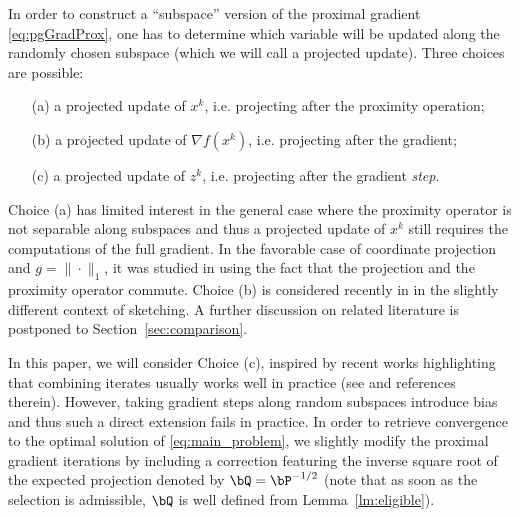 In order to construct a ``subspace'' version of the proximal gradient \eqref{eq:pgGradProx}, one has to determine which variable will be updated along the randomly chosen subspace (which we will call a projected update). Three choices are possible: 
\begin{itemize}
    \item[(a)] a projected update of $x^k$,  i.e. projecting after the proximity operation;
    \item[(b)] a projected update of $\nabla f(x^k)$,  i.e. projecting after the gradient;
    \item[(c)] a projected update of $z^k$,  i.e. projecting after the gradient \emph{step}.
\end{itemize}
Choice (a) has limited interest in the general case where the proximity operator is not separable along subspaces and thus a projected update of $x^k$ still requires the computations of the full gradient. In the favorable case of coordinate projection and $g=\|\cdot\|_1$, it was studied in \cite{qu2016coordinate} using the fact that the projection and the proximity operator commute. Choice (b) is considered recently in \cite{hanzely2018sega} in the slightly different context of sketching. A further discussion on related literature is postponed to Section~\ref{sec:comparison}.

In this paper, we will consider %
Choice (c), inspired by recent works highlighting that combining iterates usually works well in practice (see \cite{mishchenko2018distributed} and references therein). However, taking gradient steps along random subspaces introduce bias and thus such a direct extension fails in practice. In order to retrieve convergence to the optimal solution of \eqref{eq:main_problem}, we slightly modify the proximal gradient iterations by including a correction featuring the inverse square root of the expected projection denoted by $ \bQ= \bP^{-1/2}$ (note that as soon as the selection is admissible, $ \bQ$ is well defined from Lemma~\ref{lm:eligible}).


